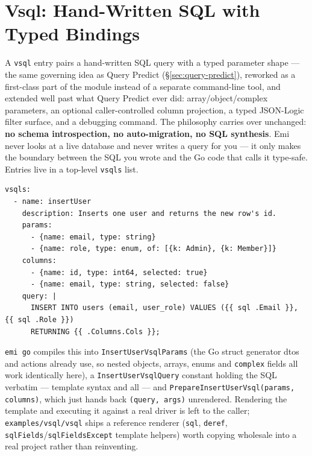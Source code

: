 \section{Vsql: Hand-Written SQL with Typed Bindings}
\label{sec:vsql}

A \texttt{vsql} entry pairs a hand-written SQL query with a typed
parameter shape --- the same governing idea as Query Predict
(\S\ref{sec:query-predict}), reworked as a first-class part of the
module instead of a separate command-line tool, and extended well past
what Query Predict ever did: array/object/complex parameters, an
optional caller-controlled column projection, a typed JSON-Logic
filter surface, and a debugging command.
The philosophy carries over unchanged: \textbf{no schema
introspection, no auto-migration, no SQL synthesis}. Emi never looks
at a live database and never writes a query for you --- it only makes
the boundary between the SQL you wrote and the Go code that calls it
type-safe. Entries live in a top-level \texttt{vsqls} list.

\begin{lstlisting}
vsqls:
  - name: insertUser
    description: Inserts one user and returns the new row's id.
    params:
      - {name: email, type: string}
      - {name: role, type: enum, of: [{k: Admin}, {k: Member}]}
    columns:
      - {name: id, type: int64, selected: true}
      - {name: email, type: string, selected: false}
    query: |
      INSERT INTO users (email, user_role) VALUES ({{ sql .Email }}, {{ sql .Role }})
      RETURNING {{ .Columns.Cols }};
\end{lstlisting}

\texttt{emi go} compiles this into \texttt{InsertUserVsqlParams} (the
Go struct generator dtos and actions already use, so nested objects,
arrays, enums and \texttt{complex} fields all work identically here),
a \texttt{InsertUserVsqlQuery} constant holding the SQL verbatim ---
template syntax and all --- and \texttt{PrepareInsertUserVsql(params,
columns)}, which just hands back \texttt{(query, args)} unrendered.
Rendering the template and executing it against a real driver is left
to the caller; \texttt{examples/vsql/vsql} ships a reference renderer
(\texttt{sql}, \texttt{deref}, \texttt{sqlFields}/\texttt{sqlFieldsExcept}
template helpers) worth copying wholesale into a real project rather
than reinventing.

